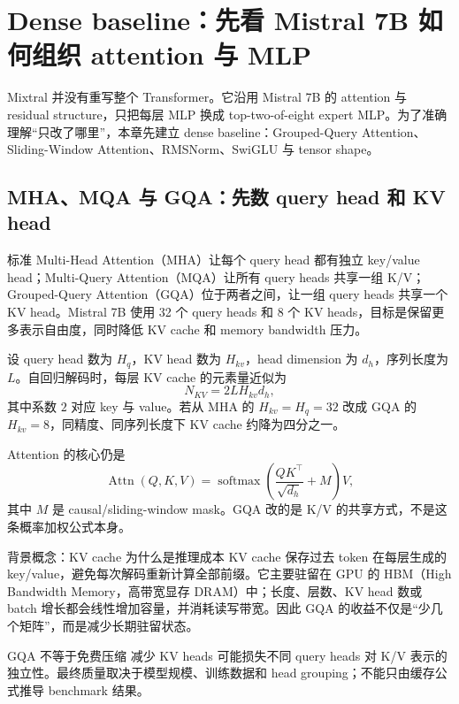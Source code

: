 \section{Dense baseline：先看 Mistral 7B 如何组织 attention 与 MLP}

Mixtral 并没有重写整个 Transformer。它沿用 Mistral 7B 的 attention 与 residual structure，只把每层 MLP 换成 top-two-of-eight expert MLP。为了准确理解“只改了哪里”，本章先建立 dense baseline：Grouped-Query Attention、Sliding-Window Attention、RMSNorm、SwiGLU 与 tensor shape。

\subsection{MHA、MQA 与 GQA：先数 query head 和 KV head}

标准 Multi-Head Attention（MHA）让每个 query head 都有独立 key/value head；Multi-Query Attention（MQA）让所有 query heads 共享一组 K/V；Grouped-Query Attention（GQA）位于两者之间，让一组 query heads 共享一个 KV head。Mistral 7B 使用 32 个 query heads 和 8 个 KV heads，目标是保留更多表示自由度，同时降低 KV cache 和 memory bandwidth 压力。


设 query head 数为 $H_q$，KV head 数为 $H_{kv}$，head dimension 为 $d_h$，序列长度为 $L$。自回归解码时，每层 KV cache 的元素量近似为
\[
N_{KV}=2L H_{kv}d_h,
\]
其中系数 $2$ 对应 key 与 value。若从 MHA 的 $H_{kv}=H_q=32$ 改成 GQA 的 $H_{kv}=8$，同精度、同序列长度下 KV cache 约降为四分之一。

Attention 的核心仍是
\[
\operatorname{Attn}(Q,K,V)=\operatorname{softmax}\!\left(\frac{QK^{\top}}{\sqrt{d_h}}+M\right)V,
\]
其中 $M$ 是 causal/sliding-window mask。GQA 改的是 K/V 的共享方式，不是这条概率加权公式本身。

\begin{knowledgebox}{背景概念：KV cache 为什么是推理成本}
KV cache 保存过去 token 在每层生成的 key/value，避免每次解码重新计算全部前缀。它主要驻留在 GPU 的 HBM（High Bandwidth Memory，高带宽显存 DRAM）中；长度、层数、KV head 数或 batch 增长都会线性增加容量，并消耗读写带宽。因此 GQA 的收益不仅是“少几个矩阵”，而是减少长期驻留状态。
\end{knowledgebox}

\begin{warningbox}{GQA 不等于免费压缩}
减少 KV heads 可能损失不同 query heads 对 K/V 表示的独立性。最终质量取决于模型规模、训练数据和 head grouping；不能只由缓存公式推导 benchmark 结果。
\end{warningbox}


